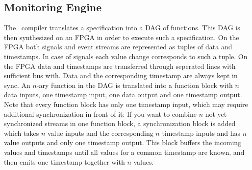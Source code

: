 \subsection{Monitoring Engine}

The \tessla\ compiler translates a specification into a DAG of functions.
This DAG is then synthesized on an FPGA in order to execute such a specification.
On the FPGA both signals and event streams are represented
as tuples of data and timestamps.
In case of signals each value change corresponds to such a tuple.
On the FPGA data and timestamps are transferred through seperated lines
with sufficient bus with.
Data and the corresponding timestamp are always kept in sync.
An $n$-ary function in the DAG is translated into a function block with $n$ data inputs,
one timestamp input, one data output and one timestamp output.
Note that every function block has only one timestamp input,
which may require additional synchronization in front of it:
If you want to combine $n$ not yet synchronized streams in one function block,
a synchronization block is added which takes $n$ value inputs and the corresponding $n$ timestamp inputs
and has $n$ value outputs and only one timestamp output.
This block buffers the incoming values and timestamps until all values for a common timestamp are known,
and then emits one timestamp together with $n$ values.
